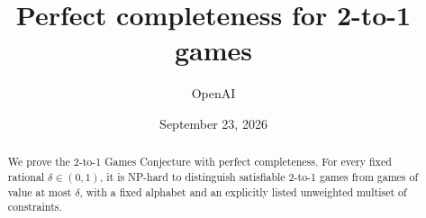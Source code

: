 \documentclass[11pt]{article}
\title{Perfect completeness for 2-to-1 games}
\author{OpenAI}
\date{September 23, 2026}
\theoremstyle{definition}
\theoremstyle{remark}
\numberwithin{equation}{section}
\begin{document}
\maketitle
\begin{abstract}
We prove the 2-to-1 Games Conjecture with perfect completeness.
For every fixed rational $\delta\in(0,1)$, it is NP-hard to distinguish
satisfiable 2-to-1 games from games of value at most $\delta$, with a fixed
alphabet and an explicitly listed unweighted multiset of constraints.
\end{abstract}










\end{document}
